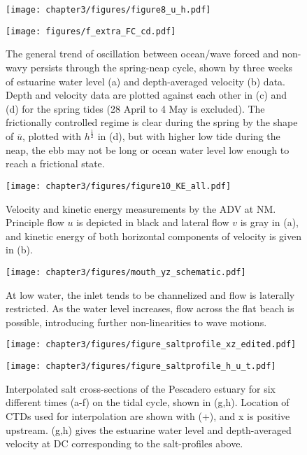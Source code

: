 \begin{figure}
\texttt{[image: chapter3/figures/figure8\_u\_h.pdf]}

\texttt{[image: figures/f\_extra\_FC\_cd.pdf]}

\protect\caption{The general trend of oscillation between ocean/wave forced and non-wavy
persists through the spring-neap cycle, shown by three weeks of estuarine
water level (a) and depth-averaged velocity (b) data. Depth and velocity
data are plotted against each other in (c) and (d) for the spring
tides (28 April to 4 May is excluded). The frictionally controlled
regime is clear during the spring by the shape of $\overline{u}$,
plotted with $h^{\frac{1}{2}}$ in (d), but with higher low tide during
the neap, the ebb may not be long or ocean water level low enough
to reach a frictional state. \label{f8_ltHU}}
\end{figure}


\begin{figure}
\texttt{[image: chapter3/figures/figure10\_KE\_all.pdf]}\protect\caption{Velocity and kinetic energy measurements by the ADV at NM. Principle
flow $u$ is depicted in black and lateral flow $v$ is gray in (a),
and kinetic energy of both horizontal components of velocity is given
in (b). \label{f9_KE}}
\end{figure}


\begin{figure}
\texttt{[image: chapter3/figures/mouth\_yz\_schematic.pdf]}\protect\caption{At low water, the inlet tends to be channelized and flow is laterally
restricted. As the water level increases, flow across the flat beach
is possible, introducing further non-linearities to wave motions.
\label{f10_mouth_yz}}
\end{figure}



\begin{figure}
\texttt{[image: chapter3/figures/figure\_saltprofile\_xz\_edited.pdf]}

\texttt{[image: chapter3/figures/figure\_saltprofile\_h\_u\_t.pdf]}

\protect\caption{Interpolated salt cross-sections of the Pescadero estuary for six
different times (a-f) on the tidal cycle, shown in (g,h). Location
of CTDs used for interpolation are shown with (+), and x is positive
upstream. (g,h) gives the estuarine water level and depth-averaged
velocity at DC corresponding to the salt-profiles above. \label{f10_Sxz}}
\end{figure}


